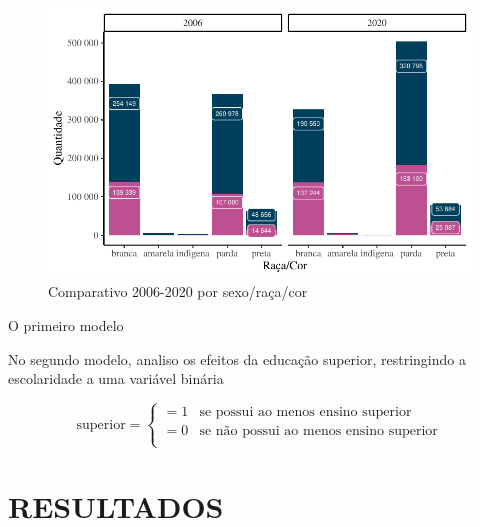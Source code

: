 \documentclass[
  12pt,
  letterpaper,
  DIV=11,
  numbers=noendperiod]{scrartcl}
\begin{document}
\begin{figure}

{\centering \includegraphics[width=1\textwidth,height=\textheight]{monografia_files/figure-pdf/count raca e cor-1.pdf}

}

\caption{Comparativo 2006-2020 por sexo/raça/cor}

\end{figure}

O primeiro modelo

No segundo modelo, analiso os efeitos da educação superior, restringindo
a escolaridade a uma variável binária

\[
\text{superior}=
\begin{cases}
    =1 & \text{se possui ao menos ensino superior} \\
    =0 & \text{se não possui ao menos ensino superior} \\
\end{cases}
\]

\hypertarget{resultados}{%
\section{RESULTADOS}\label{resultados}}
\end{document}
